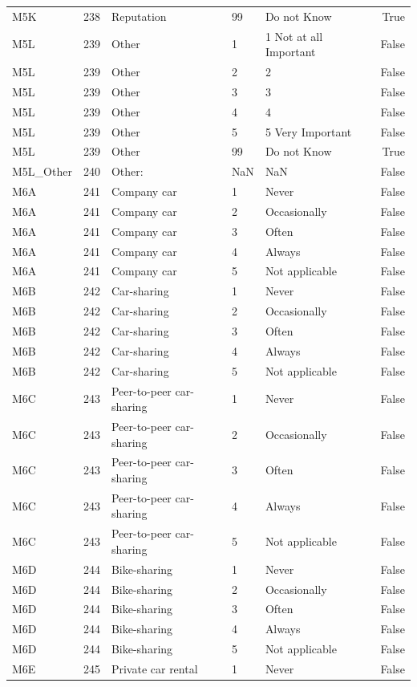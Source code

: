 \begin{tabular}{lrlllr}
M5K & 238 & Reputation & 99 & Do not Know & True \\
M5L & 239 & Other & 1 & 1 Not at all Important & False \\
M5L & 239 & Other & 2 & 2 & False \\
M5L & 239 & Other & 3 & 3 & False \\
M5L & 239 & Other & 4 & 4 & False \\
M5L & 239 & Other & 5 & 5 Very Important & False \\
M5L & 239 & Other & 99 & Do not Know & True \\
M5L_Other & 240 & Other: & NaN & NaN & False \\
M6A & 241 & Company car & 1 & Never & False \\
M6A & 241 & Company car & 2 & Occasionally & False \\
M6A & 241 & Company car & 3 & Often & False \\
M6A & 241 & Company car & 4 & Always & False \\
M6A & 241 & Company car & 5 & Not applicable & False \\
M6B & 242 & Car-sharing & 1 & Never & False \\
M6B & 242 & Car-sharing & 2 & Occasionally & False \\
M6B & 242 & Car-sharing & 3 & Often & False \\
M6B & 242 & Car-sharing & 4 & Always & False \\
M6B & 242 & Car-sharing & 5 & Not applicable & False \\
M6C & 243 & Peer-to-peer car-sharing & 1 & Never & False \\
M6C & 243 & Peer-to-peer car-sharing & 2 & Occasionally & False \\
M6C & 243 & Peer-to-peer car-sharing & 3 & Often & False \\
M6C & 243 & Peer-to-peer car-sharing & 4 & Always & False \\
M6C & 243 & Peer-to-peer car-sharing & 5 & Not applicable & False \\
M6D & 244 & Bike-sharing & 1 & Never & False \\
M6D & 244 & Bike-sharing & 2 & Occasionally & False \\
M6D & 244 & Bike-sharing & 3 & Often & False \\
M6D & 244 & Bike-sharing & 4 & Always & False \\
M6D & 244 & Bike-sharing & 5 & Not applicable & False \\
M6E & 245 & Private car rental & 1 & Never & False \\

\end{tabular}
